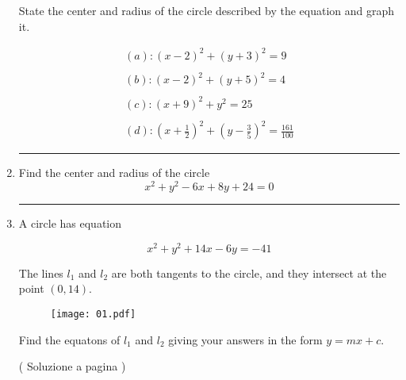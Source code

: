\begin{enumerate}
State the center and radius of the circle described by the equation and graph it.

\begin{equation*}
\begin{split}
(a): (x-2)^2+(y+3)^2=9 \\
\\
(b): (x-2)^2+(y+5)^2=4 \\
\\
(c): (x+9)^2+y^2=25 \\
\\
(d): (x+\frac{1}{2})^2+(y-\frac{3}{5})^2=\frac{161}{100}
\end{split}
\end{equation*}



\vspace{1cm}
\hrule
\vspace{1cm}


\item  \label{circ_04}

Find the center and radius of the circle 
\begin{equation*}
x^2+y^2-6x+8y+24=0 
\end{equation*}




\vspace{1cm}
\hrule
\vspace{1cm}



\item  \label{geop_01}
A circle has equation 

\begin{equation*}
x^2+y^2+14x-6y=-41
\end{equation*}

The lines $l_1$ and $l_2$ are both tangents to the circle, 
and they intersect at the point $(0,14)$.

\begin{figure}[h]
\centering
\texttt{[image: 01.pdf]}
\end{figure}

Find the equatons of $l_1$ and $l_2$ giving your answers in the form $y=mx+c$.

( Soluzione a pagina \pageref{geos_01} )



\end{enumerate}
